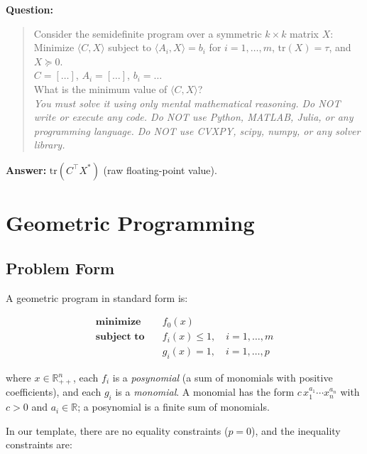 \documentclass[12pt]{article}
\begin{document}
\vspace{6pt}
\noindent\textbf{Question:}
\begin{quote}
Consider the semidefinite program over a symmetric $k \times k$ matrix $X$:\\
Minimize $\langle C, X \rangle$ subject to $\langle A_i, X \rangle = b_i$ for $i = 1, \ldots, m$,
$\mathrm{tr}(X) = \tau$, and $X \succeq 0$.\\[4pt]
$C = [\ldots]$, $A_i = [\ldots]$, $b_i = \ldots$\\[4pt]
What is the minimum value of $\langle C, X \rangle$?\\[4pt]
\textit{You must solve it using only mental mathematical reasoning.
Do NOT write or execute any code.
Do NOT use Python, MATLAB, Julia, or any programming language.
Do NOT use CVXPY, scipy, numpy, or any solver library.}
\end{quote}

\noindent\textbf{Answer:} $\mathrm{tr}(C^\top X^*)$ (raw floating-point value).

\section{Geometric Programming}

\subsection{Problem Form}

A geometric program in standard form is:

\begin{align*}
    \textbf{minimize}   \quad & f_0(x) \\
    \textbf{subject to} \quad & f_i(x) \leq 1, \quad i = 1, \ldots, m \\
                              & g_i(x) = 1, \quad i = 1, \ldots, p
\end{align*}

\noindent where $x \in \mathbb{R}^n_{++}$, each $f_i$ is a \textit{posynomial}
(a sum of monomials with positive coefficients), and each $g_i$ is a \textit{monomial}.
A monomial has the form $c\, x_1^{a_1} \cdots x_n^{a_n}$ with $c > 0$ and $a_i \in \mathbb{R}$;
a posynomial is a finite sum of monomials.

\vspace{6pt}
\noindent In our template, there are no equality constraints ($p = 0$), and the inequality constraints are:
\end{document}
